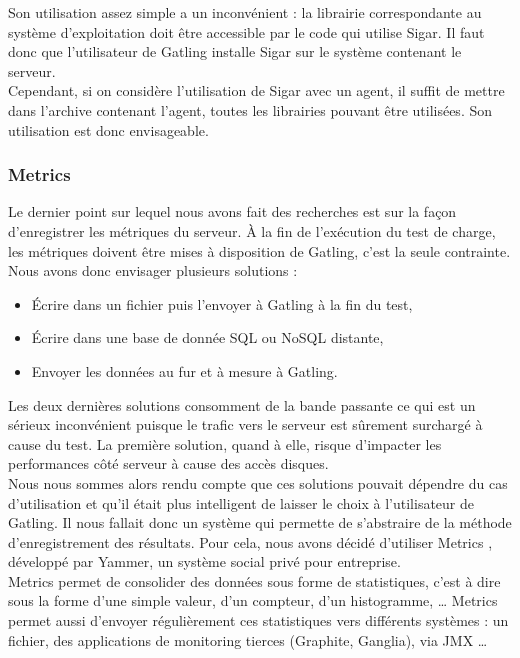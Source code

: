 Son utilisation assez simple a un inconvénient : la librairie correspondante au système d'exploitation doit être accessible par le code qui utilise Sigar. Il faut donc que l'utilisateur de Gatling installe Sigar sur le système contenant le serveur.\\

Cependant, si on considère l'utilisation de Sigar avec un agent, il suffit de mettre dans l'archive contenant l'agent, toutes les librairies pouvant être utilisées. Son utilisation est donc envisageable.

\subsubsection{Metrics}

Le dernier point sur lequel nous avons fait des recherches est sur la façon d'enregistrer les métriques du serveur. À la fin de l'exécution du test de charge, les métriques doivent être mises à disposition de Gatling, c'est la seule contrainte.\\

Nous avons donc envisager plusieurs solutions :

\begin{itemize}
 \item Écrire dans un fichier puis l'envoyer à Gatling à la fin du test,
 \item Écrire dans une base de donnée SQL ou NoSQL distante,
 \item Envoyer les données au fur et à mesure à Gatling.\\
\end{itemize}

Les deux dernières solutions consomment de la bande passante ce qui est un sérieux inconvénient puisque le trafic vers le serveur est sûrement surchargé à cause du test. La première solution, quand à elle, risque d'impacter les performances côté serveur à cause des accès disques.\\

Nous nous sommes alors rendu compte que ces solutions pouvait dépendre du cas d'utilisation et qu'il était plus intelligent de laisser le choix à l'utilisateur de Gatling. Il nous fallait donc un système qui permette de s'abstraire de la méthode d'enregistrement des résultats. Pour cela, nous avons décidé d'utiliser Metrics \cite{metrics}, développé par Yammer, un système social privé pour entreprise.\\

Metrics permet de consolider des données sous forme de statistiques, c'est à dire sous la forme d'une simple valeur, d'un compteur, d'un histogramme, \dots{} Metrics permet aussi d'envoyer régulièrement ces statistiques vers différents systèmes : un fichier, des applications de monitoring tierces (Graphite, Ganglia), via JMX \dots{}\\

